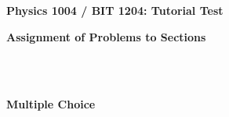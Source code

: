 \documentclass[12pt]{article}
\begin{document}




\begin{minipage}[t]{\textwidth}

\centerline{\textbf{\huge \textbf{Physics 1004 / BIT 1204}: Tutorial Test \testNumber}}
\vspace{0.1cm}
\centerline{\textbf{\large \testChapters}}
\vspace{0.2cm}
\centerline{\textbf{Assignment of Problems to Sections}}
\vspace{0.5cm}


\vspace{1.5cm}
\begin{multicols}{2}
\begin{mdframed}
 \\ \\
\end{mdframed}
\columnbreak

\begin{mdframed}
\centerline{\textbf{Multiple Choice}}

\vspace{0.5cm}
 

\end{mdframed}
\end{multicols}
\end{minipage}
\end{document}
